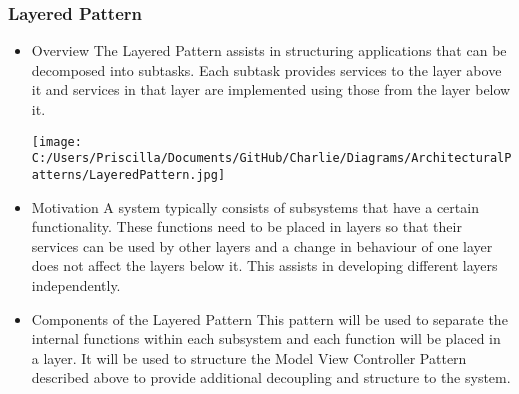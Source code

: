 \documentclass[a4paper,12pt]{article}
\begin{document}
\subsubsection{Layered Pattern}
\begin{itemize}
\item{Overview}
\newline
The Layered Pattern assists in structuring applications that can be decomposed into subtasks. Each subtask provides services to the layer above it and services in that layer are implemented using those from the layer below it.
\newline
\begin{minipage}{\linewidth} 
\centering
\texttt{[image: C:/Users/Priscilla/Documents/GitHub/Charlie/Diagrams/ArchitecturalPatterns/LayeredPattern.jpg]}
\end{minipage}
\item{Motivation}
\newline
A system typically consists of subsystems that have a certain functionality. These functions need to be placed in layers so that their services can be used by other layers and a change in behaviour of one layer does not affect the layers below it. This assists in developing different layers independently. 

\item{Components of the Layered Pattern}
\newline
This pattern will be used to separate the internal functions within each subsystem and each function will be placed in a layer. It will be used to structure the Model View Controller Pattern described above to provide additional decoupling and structure to the system.
\newline

\end{itemize}
\end{document}
